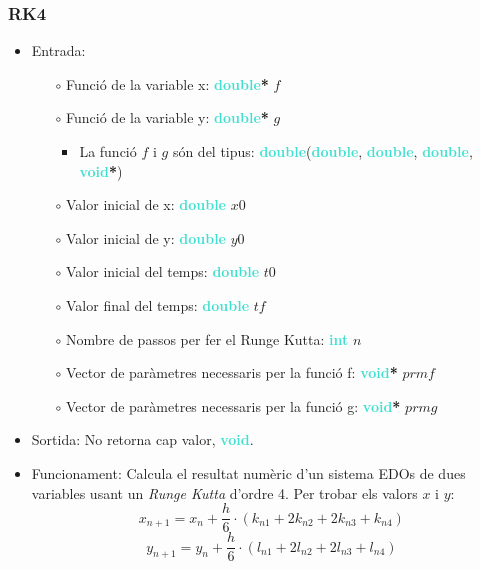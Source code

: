 \documentclass[a4paper, 11pt]{article}
\begin{document}
\subsubsection{RK4}\label{muller}
\begin{itemize}
    \item Entrada: 
    \begin{itemize}
        \item[$\circ$] Funció de la variable x: \textbf{\textcolor{Turquoise}{double}}\textbf{\textcolor{deepmagenta}{*}} $f$
        \item[$\circ$] Funció de la variable y: \textbf{\textcolor{Turquoise}{double}}\textbf{\textcolor{deepmagenta}{*}} $g$
        \begin{itemize}
            \item La funció $f$ i $g$ són del tipus: \textbf{\textcolor{Turquoise}{double}}(\textbf{\textcolor{Turquoise}{double}}, \textbf{\textcolor{Turquoise}{double}}, \textbf{\textcolor{Turquoise}{double}}, \textbf{\textcolor{Turquoise}{void}}\textbf{\textcolor{deepmagenta}{*}})
        \end{itemize}
        \item[$\circ$] Valor inicial de x: \textbf{\textcolor{Turquoise}{double}} $x0$
        \item[$\circ$] Valor inicial de y: \textbf{\textcolor{Turquoise}{double}} $y0$
        \item[$\circ$] Valor inicial del temps: \textbf{\textcolor{Turquoise}{double}} $t0$
        \item[$\circ$] Valor final del temps:
        \textbf{\textcolor{Turquoise}{double}} $tf$
        \item[$\circ$] Nombre de passos per fer el Runge Kutta:
        \textbf{\textcolor{Turquoise}{int}} $n$
        \item[$\circ$] Vector de paràmetres necessaris per la funció f: \textbf{\textcolor{Turquoise}{void}}\textbf{\textcolor{deepmagenta}{*}} $prmf$
        \item[$\circ$] Vector de paràmetres necessaris per la funció g: \textbf{\textcolor{Turquoise}{void}}\textbf{\textcolor{deepmagenta}{*}} $prmg$
    \end{itemize}
    \item Sortida: No retorna cap valor, \textbf{\textcolor{Turquoise}{void}}.
    \item Funcionament: Calcula el resultat numèric d'un sistema EDOs de dues variables usant un \textit{Runge Kutta} d'ordre 4. Per trobar els valors $x$ i $y$:
    $$x_{n+1} = x_n + \frac{h}{6}\cdot (k_{n1} + 2k_{n2} +2k_{n3} + k_{n4})$$
    $$y_{n+1} = y_n + \frac{h}{6}\cdot (l_{n1} + 2l_{n2} +2l_{n3} + l_{n4})$$
\end{itemize}
\newpage
\end{document}
